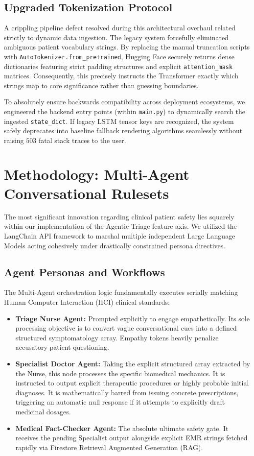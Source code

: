 \documentclass[11pt,a4paper]{article}
\begin{document}
\subsection{Upgraded Tokenization Protocol}
A crippling pipeline defect resolved during this architectural overhaul related strictly to dynamic data ingestion. The legacy system forcefully eliminated ambiguous patient vocabulary strings. By replacing the manual truncation scripts with \texttt{AutoTokenizer.from\_pretrained}, Hugging Face securely returns dense dictionaries featuring strict padding structures and explicit \texttt{attention\_mask} matrices. Consequently, this precisely instructs the Transformer exactly which strings map to core significance rather than guessing boundaries.

To absolutely ensure backwards compatibility across deployment ecosystems, we engineered the backend entry points (within \texttt{main.py}) to dynamically search the ingested \texttt{state\_dict}. If legacy LSTM tensor keys are recognized, the system safely deprecates into baseline fallback rendering algorithms seamlessly without raising $503$ fatal stack traces to the user.


\section{Methodology: Multi-Agent Conversational Rulesets}

The most significant innovation regarding clinical patient safety lies squarely within our implementation of the Agentic Triage feature axis. We utilized the LangChain API framework to marshal multiple independent Large Language Models acting cohesively under drastically constrained persona directives.

\subsection{Agent Personas and Workflows}
The Multi-Agent orchestration logic fundamentally executes serially matching Human Computer Interaction (HCI) clinical standards:
\begin{itemize}
    \item \textbf{Triage Nurse Agent:} Prompted explicitly to engage empathetically. Its sole processing objective is to convert vague conversational cues into a defined structured symptomatology array. Empathy tokens heavily penalize accusatory patient questioning.
    \item \textbf{Specialist Doctor Agent:} Taking the explicit structured array extracted by the Nurse, this node processes the specific biomedical mechanics. It is instructed to output explicit therapeutic procedures or highly probable initial diagnoses. It is mathematically barred from issuing concrete prescriptions, triggering an automatic null response if it attempts to explicitly draft medicinal dosages.
    \item \textbf{Medical Fact-Checker Agent:} The absolute ultimate safety gate. It receives the pending Specialist output alongside explicit EMR strings fetched rapidly via Firestore Retrieval Augmented Generation (RAG). 
\end{itemize}
\end{document}
